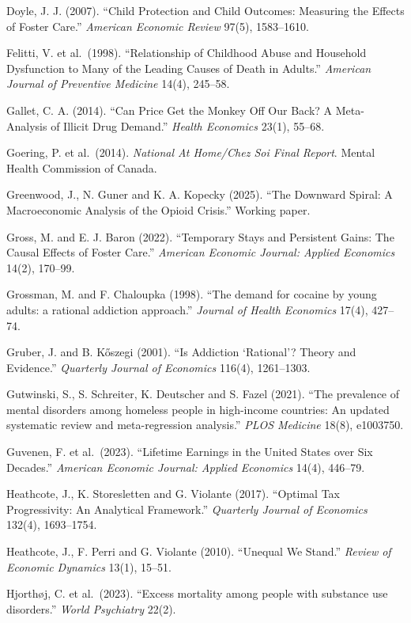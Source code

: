 \documentclass[10pt]{article}
\begin{document}
{\begin{list}{}{\setlength{\leftmargin}{1.5em}\setlength{\itemindent}{-1.5em}\setlength{\itemsep}{0.35em}\setlength{\parsep}{0em}}
\item Doyle, J. J. (2007). ``Child Protection and Child Outcomes: Measuring the Effects of Foster Care.'' \emph{American Economic Review} 97(5), 1583--1610.
\item Felitti, V. et al.\ (1998). ``Relationship of Childhood Abuse and Household Dysfunction to Many of the Leading Causes of Death in Adults.'' \emph{American Journal of Preventive Medicine} 14(4), 245--58.
\item Gallet, C. A. (2014). ``Can Price Get the Monkey Off Our Back? A Meta-Analysis of Illicit Drug Demand.'' \emph{Health Economics} 23(1), 55--68.
\item Goering, P. et al.\ (2014). \emph{National At Home/Chez Soi Final Report}. Mental Health Commission of Canada.
\item Greenwood, J., N. Guner and K. A. Kopecky (2025). ``The Downward Spiral: A Macroeconomic Analysis of the Opioid Crisis.'' Working paper.
\item Gross, M. and E. J. Baron (2022). ``Temporary Stays and Persistent Gains: The Causal Effects of Foster Care.'' \emph{American Economic Journal: Applied Economics} 14(2), 170--99.
\item Grossman, M. and F. Chaloupka (1998). ``The demand for cocaine by young adults: a rational addiction approach.'' \emph{Journal of Health Economics} 17(4), 427--74.
\item Gruber, J. and B. K\H{o}szegi (2001). ``Is Addiction `Rational'? Theory and Evidence.'' \emph{Quarterly Journal of Economics} 116(4), 1261--1303.
\item Gutwinski, S., S. Schreiter, K. Deutscher and S. Fazel (2021). ``The prevalence of mental disorders among homeless people in high-income countries: An updated systematic review and meta-regression analysis.'' \emph{PLOS Medicine} 18(8), e1003750.
\item Guvenen, F. et al.\ (2023). ``Lifetime Earnings in the United States over Six Decades.'' \emph{American Economic Journal: Applied Economics} 14(4), 446--79.
\item Heathcote, J., K. Storesletten and G. Violante (2017). ``Optimal Tax Progressivity: An Analytical Framework.'' \emph{Quarterly Journal of Economics} 132(4), 1693--1754.
\item Heathcote, J., F. Perri and G. Violante (2010). ``Unequal We Stand.'' \emph{Review of Economic Dynamics} 13(1), 15--51.
\item Hjorth\o j, C. et al.\ (2023). ``Excess mortality among people with substance use disorders.'' \emph{World Psychiatry} 22(2).

\end{list}}
\end{document}
